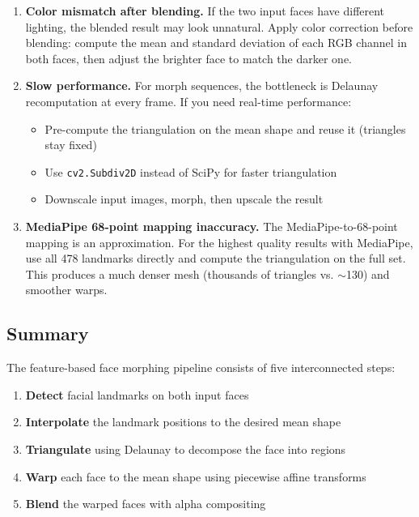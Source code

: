 \begin{enumerate}
    \item \textbf{Color mismatch after blending.} If the two input faces have different lighting, the blended result may look unnatural. Apply color correction before blending: compute the mean and standard deviation of each RGB channel in both faces, then adjust the brighter face to match the darker one.

    \item \textbf{Slow performance.} For morph sequences, the bottleneck is Delaunay recomputation at every frame. If you need real-time performance:
    \begin{itemize}
        \item Pre-compute the triangulation on the mean shape and reuse it (triangles stay fixed)
        \item Use \texttt{cv2.Subdiv2D} instead of SciPy for faster triangulation
        \item Downscale input images, morph, then upscale the result
    \end{itemize}

    \item \textbf{MediaPipe 68-point mapping inaccuracy.} The MediaPipe-to-68-point mapping is an approximation. For the highest quality results with MediaPipe, use all 478 landmarks directly and compute the triangulation on the full set. This produces a much denser mesh (thousands of triangles vs. $\sim$130) and smoother warps.
\end{enumerate}

\subsection{Summary}

The feature-based face morphing pipeline consists of five interconnected steps:
\begin{enumerate}
    \item \textbf{Detect} facial landmarks on both input faces
    \item \textbf{Interpolate} the landmark positions to the desired mean shape
    \item \textbf{Triangulate} using Delaunay to decompose the face into regions
    \item \textbf{Warp} each face to the mean shape using piecewise affine transforms
    \item \textbf{Blend} the warped faces with alpha compositing
\end{enumerate}

